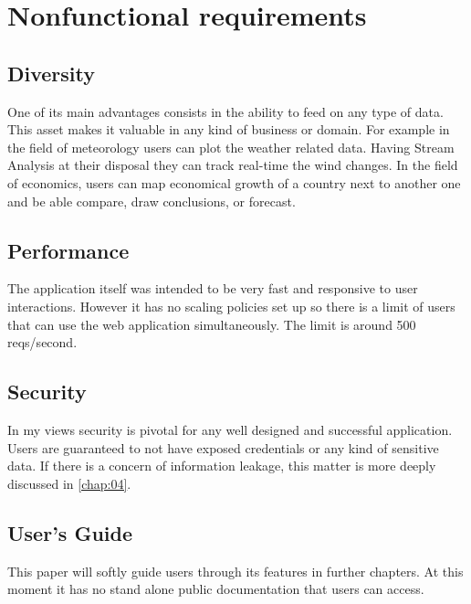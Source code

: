 \section{Nonfunctional requirements}
\label{chap:02:01}

\subsection{Diversity}
\label{chap:02:01:01}
One of its main advantages consists in the ability to feed on any type of data. This asset makes it valuable in any kind of business or domain. For example in the field of meteorology users can plot the weather related data. Having Stream Analysis at their disposal they can track real-time the wind changes. In the field of economics, users can map economical growth of a country next to another one and be able compare, draw conclusions, or forecast.

\subsection{Performance}
\label{chap:02:01:02}
The application itself was intended to be very fast and responsive to user interactions. However it has no scaling policies set up so there is a limit of users that can use the web application simultaneously. The limit is around 500 reqs/second.

\subsection{Security}
\label{chap:02:01:03}
In my views security is pivotal for any well designed and successful application. Users are guaranteed to not have exposed credentials or any kind of sensitive data. If there is a concern of information leakage, this matter is more deeply discussed in \autoref{chap:04}.  

\subsection{User's Guide}
\label{chap:02:01:04}
This paper will softly guide users through its features in further chapters. At this moment it has no stand alone public documentation that users can access.

